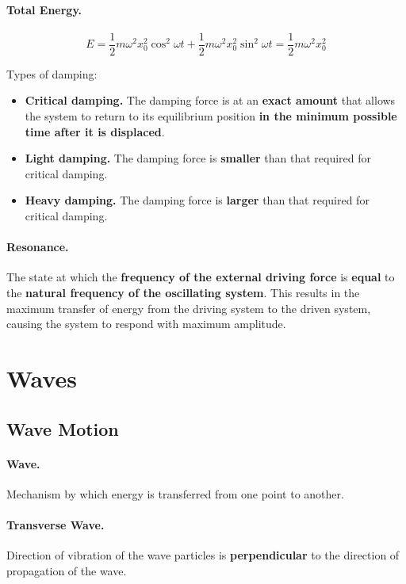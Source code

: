 \documentclass{article}
\begin{document}
\paragraph{Total Energy.} \begin{equation} E = \frac{1}{2}m\omega^2
x_0^2\cos^2\omega t + \frac{1}{2}m\omega^2 x_0^2\sin^2\omega t =
\frac{1}{2}m\omega^2 x_0^2 \end{equation}

Types of damping: \begin{itemize} \item \textbf{Critical damping.} The damping
    force is at an \textbf{exact amount} that allows the system to return to its
  equilibrium position \textbf{in the minimum possible time after it is
displaced}.  \item \textbf{Light damping.} The damping force is \textbf{smaller}
  than that required for critical damping.  \item \textbf{Heavy damping.} The
damping force is \textbf{larger} than that required for critical damping.
\end{itemize}

\paragraph{Resonance.} The state at which the \textbf{frequency of the external
driving force} is \textbf{equal} to the \textbf{natural frequency of the
oscillating system}. This results in the maximum transfer of energy from the
driving system to the driven system, causing the system to respond with maximum
amplitude.

\section{Waves}

\subsection{Wave Motion}

\paragraph{Wave.} Mechanism by which energy is transferred from one point to
another.

\paragraph{Transverse Wave.} Direction of vibration of the wave particles is
\textbf{perpendicular} to the direction of propagation of the wave.
\end{document}
